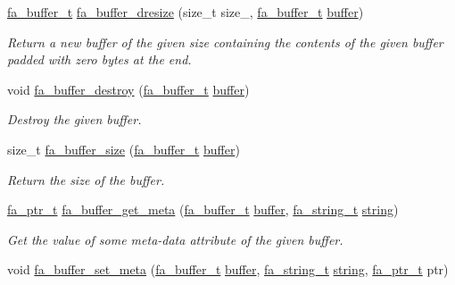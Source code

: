 \begin{DoxyCompactItemize}
\hyperlink{group___fa_buffer_ga0ed7a1d783ab322e2e8be02432d0839e}{fa\-\_\-buffer\-\_\-t} \hyperlink{group___fa_buffer_gab569f84162545bb4426a2d426ace8950}{fa\-\_\-buffer\-\_\-dresize} (size\-\_\-t size\-\_\-, \hyperlink{group___fa_buffer_ga0ed7a1d783ab322e2e8be02432d0839e}{fa\-\_\-buffer\-\_\-t} \hyperlink{util_8h_ad0c623e8b04565926f5b48888327724a}{buffer})
\begin{DoxyCompactList}\small\item\em Return a new buffer of the given size containing the contents of the given buffer padded with zero bytes at the end. \end{DoxyCompactList}\item 
void \hyperlink{group___fa_buffer_ga51af4022b7ccfc33f8ee0862c8bbad5e}{fa\-\_\-buffer\-\_\-destroy} (\hyperlink{group___fa_buffer_ga0ed7a1d783ab322e2e8be02432d0839e}{fa\-\_\-buffer\-\_\-t} \hyperlink{util_8h_ad0c623e8b04565926f5b48888327724a}{buffer})
\begin{DoxyCompactList}\small\item\em Destroy the given buffer. \end{DoxyCompactList}\item 
size\-\_\-t \hyperlink{group___fa_buffer_ga412e71a916e24b101f9b8a967b4d53f8}{fa\-\_\-buffer\-\_\-size} (\hyperlink{group___fa_buffer_ga0ed7a1d783ab322e2e8be02432d0839e}{fa\-\_\-buffer\-\_\-t} \hyperlink{util_8h_ad0c623e8b04565926f5b48888327724a}{buffer})
\begin{DoxyCompactList}\small\item\em Return the size of the buffer. \end{DoxyCompactList}\item 
\hyperlink{group___fa_ga915ddeae99ad7568b273d2b876425197}{fa\-\_\-ptr\-\_\-t} \hyperlink{group___fa_buffer_gaf21b86142b1246b676f9bfbeb54011aa}{fa\-\_\-buffer\-\_\-get\-\_\-meta} (\hyperlink{group___fa_buffer_ga0ed7a1d783ab322e2e8be02432d0839e}{fa\-\_\-buffer\-\_\-t} \hyperlink{util_8h_ad0c623e8b04565926f5b48888327724a}{buffer}, \hyperlink{group___fa_string_gacada63033b77bc6c39fa632ae199349b}{fa\-\_\-string\-\_\-t} \hyperlink{util_8h_a41106000aac73b61e4fc2ef9dd39a603}{string})
\begin{DoxyCompactList}\small\item\em Get the value of some meta-\/data attribute of the given buffer. \end{DoxyCompactList}\item 
void \hyperlink{group___fa_buffer_gac2efb810e723accb6f7e8f0ae5651a80}{fa\-\_\-buffer\-\_\-set\-\_\-meta} (\hyperlink{group___fa_buffer_ga0ed7a1d783ab322e2e8be02432d0839e}{fa\-\_\-buffer\-\_\-t} \hyperlink{util_8h_ad0c623e8b04565926f5b48888327724a}{buffer}, \hyperlink{group___fa_string_gacada63033b77bc6c39fa632ae199349b}{fa\-\_\-string\-\_\-t} \hyperlink{util_8h_a41106000aac73b61e4fc2ef9dd39a603}{string}, \hyperlink{group___fa_ga915ddeae99ad7568b273d2b876425197}{fa\-\_\-ptr\-\_\-t} ptr)

\end{DoxyCompactItemize}
